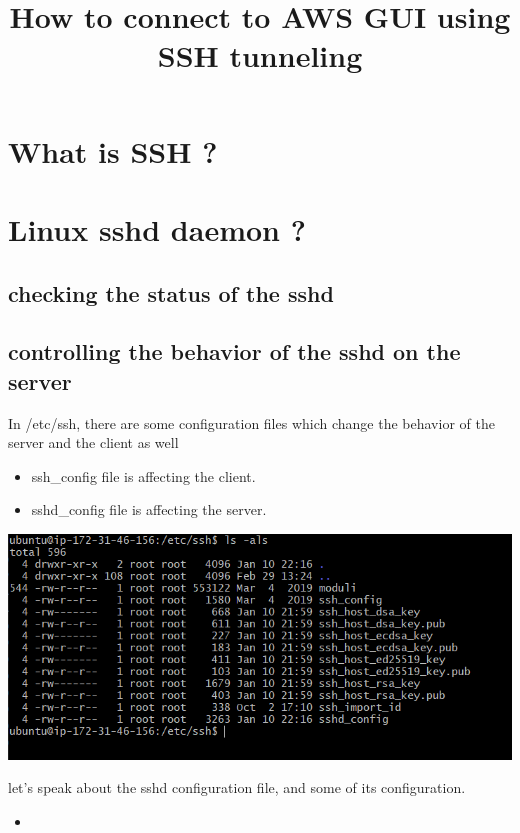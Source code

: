\documentclass{article}
\title{\textbf{How to connect to AWS GUI using SSH tunneling}}
\author{}
\date{}
\begin{document}
\maketitle

\section{What is SSH ?}

\section{Linux sshd daemon ?}
\subsection{checking the status of the sshd}
\subsection{controlling the behavior of the sshd on the server}
In /etc/ssh, there are some configuration files which change the behavior of the server and the client as well
\begin{itemize}
  \item ssh\_config file is affecting the client.
  \item sshd\_config file is affecting the server.
\end{itemize}

\begin{center}
  \includegraphics[scale=0.75]{resources/ssh/img/ssh-configfile.PNG}
\end{center}

let's speak about the sshd configuration file, and some of its configuration.
\begin{itemize}
  \item 
\end{itemize}
\end{document}
